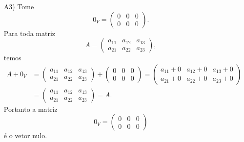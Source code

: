 \begin{exemplo}
\begin{enumerate}[label={\arabic*})]
\begin{solucao}
\begin{itemize}
				      \item[A3)] Tome
					      \[
						      0_V = \begin{pmatrix}0 & 0 & 0\\0 & 0 & 0\end{pmatrix}.
					      \]
					      Para toda matriz
					      \[
						      A = \begin{pmatrix} a_{11} & a_{12} & a_{13}\\a_{21} & a_{22} & a_{23}\end{pmatrix},
					      \]
					      temos
					      \begin{align*}
						      A + 0_V & = \begin{pmatrix} a_{11} & a_{12} & a_{13}\\a_{21} & a_{22} & a_{23}\end{pmatrix} +
						      \begin{pmatrix}0 & 0 & 0\\0 & 0 & 0\end{pmatrix}
						      = \begin{pmatrix}a_{11} + 0 & a_{12} + 0 & a_{13} + 0\\a_{21} + 0  & a_{22} + 0 & a_{23} + 0\end{pmatrix}
						      \\ &= \begin{pmatrix} a_{11} & a_{12} & a_{13}\\a_{21} & a_{22} & a_{23}\end{pmatrix} = A.
					      \end{align*}
					      Portanto a matriz
					      \[
						      0_V = \begin{pmatrix}0 & 0 & 0\\0 & 0 & 0\end{pmatrix}
					      \]
					      é o vetor nulo.


\end{itemize}
\end{solucao}
\end{enumerate}
\end{exemplo}
